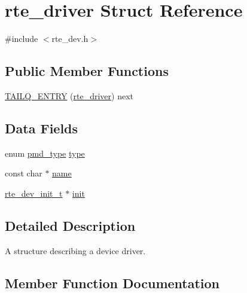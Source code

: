 \hypertarget{structrte__driver}{}\section{rte\+\_\+driver Struct Reference}
\label{structrte__driver}


{\ttfamily \#include $<$rte\+\_\+dev.\+h$>$}

\subsection*{Public Member Functions}
\begin{DoxyCompactItemize}
\item 
\hyperlink{structrte__driver_a03d76cd23b7f0ad0da857a7d3c618eca}{T\+A\+I\+L\+Q\+\_\+\+E\+N\+T\+R\+Y} (\hyperlink{structrte__driver}{rte\+\_\+driver}) next
\end{DoxyCompactItemize}
\subsection*{Data Fields}
\begin{DoxyCompactItemize}
\item 
enum \hyperlink{rte__dev_8h_abe101efbd29b695f0bd43e97b3ef1d6f}{pmd\+\_\+type} \hyperlink{structrte__driver_a64907b7f63fea328c750928dcaa78f39}{type}
\item 
const char $\ast$ \hyperlink{structrte__driver_a8f8f80d37794cde9472343e4487ba3eb}{name}
\item 
\hyperlink{rte__dev_8h_a96a605c375e891ef4f216d5268e1d1bb}{rte\+\_\+dev\+\_\+init\+\_\+t} $\ast$ \hyperlink{structrte__driver_a7cdcadfada43af8bfce0eb497857da24}{init}
\end{DoxyCompactItemize}


\subsection{Detailed Description}
A structure describing a device driver. 

\subsection{Member Function Documentation}
\hypertarget{structrte__driver_a03d76cd23b7f0ad0da857a7d3c618eca}{}
